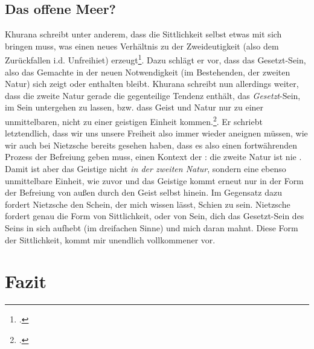 \documentclass[12pt, a4paper, openany]{report}
\begin{document}
\section{Das offene Meer?}\label{abschnitt_4}
Khurana schreibt unter anderem, dass die Sittlichkeit selbst etwas mit sich bringen muss, was einen neues Verhältnis zu der Zweideutigkeit (also dem Zurückfallen i.d. Unfreihiet) erzeugt\footcite[Vgl.][399]{khurana_freiheit_2017}.
Dazu schlägt er vor, dass das Gesetzt-Sein, also das Gemachte in der neuen Notwendigkeit (im Bestehenden, der zweiten Natur) sich zeigt oder enthalten bleibt. 
Khurana schreibt nun allerdings weiter, dass die zweite Natur gerade die gegenteilige Tendenz enthält, das \emph{Gesetzt}-Sein, im Sein untergehen zu lassen, bzw. dass Geist und Natur nur zu einer unmittelbaren, nicht zu einer geistigen Einheit kommen.\footcite[Vgl.][401]{khurana_freiheit_2017}.
Er schriebt letztendlich, dass wir uns unsere Freiheit also immer wieder aneignen müssen, wie wir auch bei Nietzsche bereits gesehen haben, dass es also einen fortwährenden Prozess der Befreiung geben muss, einen Kontext der : 
die zweite Natur ist nie .
Damit ist aber das Geistige nicht \emph{in der zweiten Natur}, sondern eine ebenso unmittelbare Einheit, wie zuvor und das Geistige kommt erneut nur in der Form der Befreiung von außen durch den Geist selbst hinein. 
Im Gegensatz dazu fordert Nietzsche den Schein, der mich wissen lässt, Schien zu sein.
Nietzsche fordert genau die Form von Sittlichkeit, oder von Sein, dich das Gesetzt-Sein des Seins in sich aufhebt (im dreifachen Sinne) und mich daran mahnt. 
Diese Form der Sittlichkeit, kommt mir unendlich vollkommener vor.


\chapter{Fazit}

\backmatter

\printbibliography
\listoftodos
 
\end{document}
